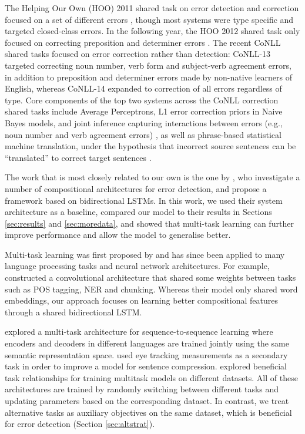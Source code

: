 \documentclass[11pt,letterpaper]{article}
\begin{document}
\begin{table*}[t]
The Helping Our Own (HOO) 2011 shared task on error detection and correction focused on a set of different errors \cite{dale2011helping}, though most systems were type specific and targeted closed-class errors. In the following year, the HOO 2012 shared task only focused on correcting preposition and determiner errors \cite{dale2012hoo}. 
The recent CoNLL shared tasks \cite{ng2013conll,Ng2014conll} focused on error correction rather than detection: CoNLL-13 targeted correcting noun number, verb form and subject-verb agreement errors, in addition to preposition and determiner errors made by non-native learners of English, whereas CoNLL-14 expanded to correction of all errors regardless of type. 
Core components of the top two systems across the CoNLL correction shared tasks include Average Perceptrons, L1 error correction priors in Naive Bayes models, and joint inference capturing interactions between errors (e.g., noun number and verb agreement errors) \cite{rozovskaya2014illinois}, as well as phrase-based statistical machine translation, under the hypothesis that incorrect source sentences can be ``translated'' to correct target sentences \cite{felice2014,grundkiewicz2014amu}.

The work that is most closely related to our own is the one by , who investigate a number of compositional architectures for error detection, and propose a framework based on bidirectional LSTMs. 
In this work, we used their system architecture as a baseline, compared our model to their results in Sections \ref{sec:results} and \ref{sec:moredata}, and showed that multi-task learning can further improve performance and allow the model to generalise better.



 Multi-task learning was first proposed by  and has since been applied to many language processing tasks and neural network architectures. 
For example,  constructed a convolutional architecture that shared some weights between tasks such as POS tagging, NER and chunking. 
Whereas their model only shared word embeddings, our approach focuses on learning better compositional features through a shared bidirectional LSTM.

 explored a multi-task architecture for sequence-to-sequence learning where encoders and decoders in different languages are trained jointly using the same semantic representation space. 
 used eye tracking measurements as a secondary task in order to improve a model for sentence compression.
 explored beneficial task relationships for training multitask models on different datasets. 
All of these architectures are trained by randomly switching between different tasks and updating parameters based on the corresponding dataset. In contrast, we treat alternative tasks as auxiliary objectives on the same dataset, which is beneficial for error detection  (Section \ref{sec:altstrat}).


\end{table*}
\end{document}
